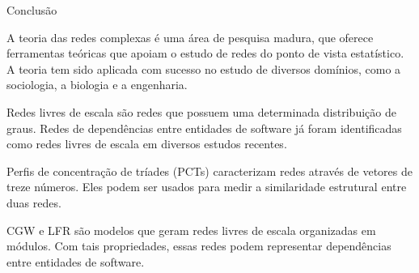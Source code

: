 \begin{section}{Conclusão} %
	
	A teoria das redes complexas é uma área de pesquisa madura, que oferece ferramentas teóricas que apoiam o estudo de redes do ponto de vista estatístico. A teoria tem sido aplicada com sucesso no estudo de diversos domínios, como a sociologia, a biologia e a engenharia.
	
	Redes livres de escala são redes que possuem uma determinada distribuição de graus. Redes de dependências entre entidades de software já foram identificadas como redes livres de escala em diversos estudos recentes.
	
	Perfis de concentração de tríades (PCTs) caracterizam redes através de vetores de treze números. Eles podem ser usados para medir a similaridade estrutural entre duas redes.
	
	CGW e LFR são modelos que geram redes livres de escala organizadas em módulos. Com tais propriedades, essas redes podem representar dependências entre entidades de software.
	
\end{section}